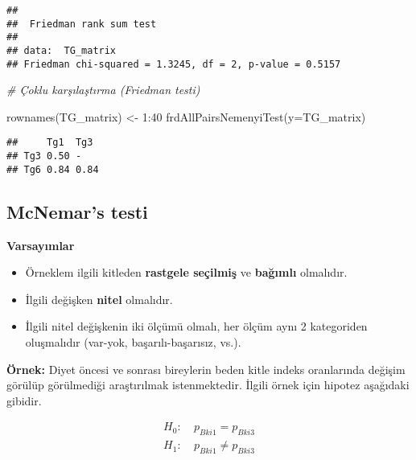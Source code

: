 \documentclass[
]{article}
\newenvironment{Shaded}{\begin{snugshade}}{\end{snugshade}}
\newcommand{\AttributeTok}[1]{\textcolor[rgb]{0.77,0.63,0.00}{#1}}
\newcommand{\CommentTok}[1]{\textcolor[rgb]{0.56,0.35,0.01}{\textit{#1}}}
\newcommand{\DecValTok}[1]{\textcolor[rgb]{0.00,0.00,0.81}{#1}}
\newcommand{\FunctionTok}[1]{\textcolor[rgb]{0.00,0.00,0.00}{#1}}
\newcommand{\NormalTok}[1]{#1}
\newcommand{\OtherTok}[1]{\textcolor[rgb]{0.56,0.35,0.01}{#1}}
\newcommand{\SpecialCharTok}[1]{\textcolor[rgb]{0.00,0.00,0.00}{#1}}
\providecommand{\tightlist}{%
  \setlength{\itemsep}{0pt}\setlength{\parskip}{0pt}}
\begin{document}
\begin{verbatim}
## 
##  Friedman rank sum test
## 
## data:  TG_matrix
## Friedman chi-squared = 1.3245, df = 2, p-value = 0.5157
\end{verbatim}

\begin{Shaded}
\begin{Highlighting}[]
\CommentTok{\# Çoklu karşılaştırma (Friedman testi)}

\FunctionTok{rownames}\NormalTok{(TG\_matrix) }\OtherTok{\textless{}{-}} \DecValTok{1}\SpecialCharTok{:}\DecValTok{40}
\FunctionTok{frdAllPairsNemenyiTest}\NormalTok{(}\AttributeTok{y=}\NormalTok{TG\_matrix)}
\end{Highlighting}
\end{Shaded}

\begin{verbatim}
##     Tg1  Tg3 
## Tg3 0.50 -   
## Tg6 0.84 0.84
\end{verbatim}

\hypertarget{mcnemars-testi}{%
\subsection{McNemar's testi}\label{mcnemars-testi}}

\textbf{Varsayımlar}

\begin{itemize}
\tightlist
\item
  Örneklem ilgili kitleden \textbf{rastgele seçilmiş} ve
  \textbf{bağımlı} olmalıdır.
\item
  İlgili değişken \textbf{nitel} olmalıdır.
\item
  İlgili nitel değişkenin iki ölçümü olmalı, her ölçüm aynı 2
  kategoriden oluşmalıdır (var-yok, başarılı-başarısız, vs.).
\end{itemize}

\textbf{Örnek:} Diyet öncesi ve sonrası bireylerin beden kitle indeks
oranlarında değişim görülüp görülmediği araştırılmak istenmektedir.
İlgili örnek için hipotez aşağıdaki gibidir.

\begin{align*}
  H_0:&~ p_{Bki1} = p_{Bki3} \\
  H_1:&~ p_{Bki1} \neq p_{Bki3}
\end{align*}

\begin{Shaded}
\end{Shaded}
\end{document}
